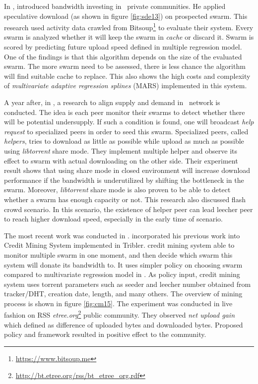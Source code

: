 In \citeyear{2013:investmentcm:capota}, \citeauthor{2013:investmentcm:capota} introduced bandwidth investing in \bt~private communities. He applied speculative download (as shown in figure \ref{fig:sde13}) on prospected swarm. This research used activity data crawled from Bitsoup\footnote{\url{https://www.bitsoup.me}} to evaluate their system. Every swarm is analyzed whether it will keep the swarm in \textit{cache} or discard it. Swarm is scored by predicting future upload speed defined in multiple regression model\cite{2013:investmentcm:capota}. One of the findings is that this algorithm depends on the size of the evaluated swarm. The more swarm need to be assessed, there is less chance the algorithm will find suitable cache to replace. This also shows the high costs and complexity of \textit{multivariate adaptive regression splines} (MARS) implemented in this system.

A year after, in \citeyear{2014:bwmarket:capota}, a research to align supply and demand in \bt~network is conducted. The idea is each peer monitor their swarms to detect whether there will be potential undersupply. If such a condition is found, one will broadcast \textit{help request} to specialized peers in order to seed this swarm. Specialized peers, called \textit{helpers}, tries to download as little as possible while upload as much as possible using \textit{libtorrent} share mode. They implement multiple helper and observe its effect to swarm with actual downloading on the other side. Their experiment result shows that using share mode in closed environment will increase download performance if the bandwidth is underutilized \cite{2014:bwmarket:capota} by shifting the bottleneck in the swarm. Moreover, \textit{libtorrent} share mode is also proven to be able to detect whether a swarm has enough capacity or not. This research also discussed flash crowd scenario. In this scenario, the existence of helper peer can lead leecher peer to reach higher download speed, especially in the early time of scenario. 

The most recent work was conducted in \citeyear{2015:creditmining:capota}\cite{2015:creditmining:capota}. \citeauthor{2015:creditmining:capota} incorporated his previous work into Credit Mining System implemented in Tribler. credit mining system able to monitor multiple swarm in one moment, and then decide which swarm this system will donate its bandwidth to. It uses simpler policy on choosing swarm compared to multivariate regression model in \cite{2013:investmentcm:capota}. As policy input, credit mining system uses torrent parameters such as seeder and leecher number obtained from tracker/DHT, creation date, length, and many others. The overview of mining process is shown in figure \ref{fig:cm15}. The experiment was conducted in live fashion on RSS \textit{etree.org}\footnote{\url{http://bt.etree.org/rss/bt\_etree\_org.rdf}} public community. They observed \textit{net upload gain} which defined as difference of uploaded bytes and downloaded bytes. Proposed policy and framework resulted in positive effect to the community.

